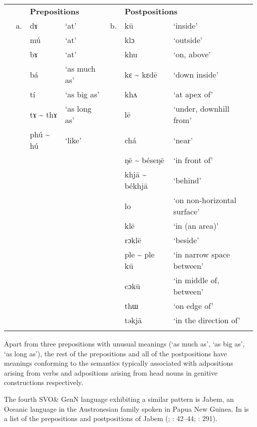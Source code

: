 \documentclass[output=paper]{langsci/langscibook}
\begin{document}
\begin{table}
\begin{tabularx}{\textwidth}{XXXXXXX} &  & \multicolumn{2}{X}{\bfseries Prepositions} &  & \multicolumn{2}{X}{\bfseries Postpositions}\\
\lsptoprule
& a. & dɤ & ‘at’ & b. & kū & ‘inside’\\
&  & mú & ‘at’ &  & klɔ & ‘outside’\\
&  & bɤ & ‘at’ &  & khu & ‘on, above’\\
&  & bá & ‘as much as’ &  & kɛ {\textasciitilde} kɛdē & ‘down inside’\\
&  & tí & ‘as big as’ &  & khʌ & ‘at apex of’\\
&  & tɤ {\textasciitilde} thɤ & ‘as long as’ &  & lē & ‘under, downhill from’\\
&  & phú {\textasciitilde} hú & ‘like’ &  & chá & ‘near’\\
&  &  &  &  & ŋē {\textasciitilde} béseŋē & ‘in front of’\\
&  &  &  &  & khjā {\textasciitilde} békhjā & ‘behind’\\
&  &  &  &  & lo & ‘on non-horizontal surface’\\
&  &  &  &  & klē & ‘in (an area)’\\
&  &  &  &  & rɔklē & ‘beside’\\
&  &  &  &  & ple {\textasciitilde} ple kū & ‘in narrow space between’\\
&  &  &  &  & cɔkū & ‘in middle of, between’\\
&  &  &  &  & thɯ & ‘on edge of’\\
&  &  &  &  & təkjā & ‘in the direction of’\\
\lspbottomrule
\end{tabularx}
\end{table}


Apart from three prepositions with unusual meanings (‘as much as’, ‘as big as’, ‘as long as’), the rest of the prepositions and all of the postpositions have meanings conforming to the semantics typically associated with adpositions arising from verbs and adpositions arising from head nouns in genitive constructions respectively.

The fourth SVO\& GenN language exhibiting a similar pattern is Jabem, an Oceanic language in the Austronesian family spoken in Papua New Guinea. In  is a list of the prepositions and postpositions of Jabem (\citealt{Dempwolff1939}; \citealt{BradshawCzobor2005}: 42–44; \citealt{Ross2002}: 291).
\end{document}
